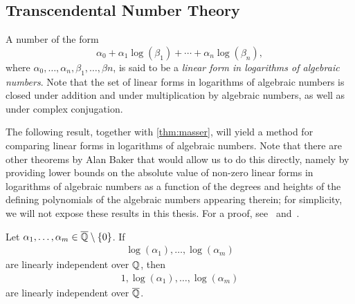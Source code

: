 \subsection{Transcendental Number Theory}


A number of the form
\begin{equation*}
  \alpha_{0} + \alpha_{1} \log(\beta_{1}) + \cdots + \alpha_{n} \log(\beta_{n}),
\end{equation*}
where $\alpha_{0}, \ldots, \alpha_{n}, \beta_{1}, \ldots, \beta{n}$, is said to be a \emph{linear form in logarithms of algebraic numbers}. Note that the set of linear forms in logarithms of algebraic numbers is closed under addition and under multiplication by algebraic numbers, as well as under complex conjugation.

The following result, together with \cref{thm:masser}, will yield a method for comparing linear forms in logarithms of algebraic numbers. Note that there are other theorems by Alan Baker that would allow us to do this directly, namely by providing lower bounds on the absolute value of non-zero linear forms in logarithms of algebraic numbers as a function of the degrees and heights of the defining polynomials of the algebraic numbers appearing therein; for simplicity, we will not expose these results in this thesis. For a proof, see~\cite{Baker75} and~\cite{BakerPaper}.

\begin{theorem}[Baker]
\label{thm:Baker}
Let $\alpha_{1}, \ldots, \alpha_{m} \in \overline{\mathbb{Q}} \setminus \lbrace 0 \rbrace$. If
\begin{align*}
\log(\alpha_{1}), \ldots, \log(\alpha_{m})
\end{align*}
are linearly independent over $\mathbb{Q}$, then
\begin{align*}
1, \log(\alpha_{1}), \ldots, \log(\alpha_{m})
\end{align*}
are linearly independent over $\overline{\mathbb{Q}}$.
\end{theorem}


